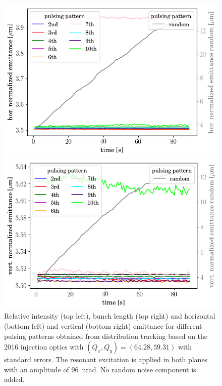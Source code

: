 \documentclass[%
 reprint,
 amsmath,amssymb,
 aps,
prstab,
]{revtex4-1}
\begin{document}
\begin{figure}[h]
\begin{minipage}[t]{0.49\linewidth}
	\end{minipage}	
	\begin{minipage}[t]{0.49\linewidth}
		\centering
		\includegraphics[width=1.0\linewidth]{2016injerra2b2u_pattern_3_5um_emit1.png}
	\end{minipage}
	\begin{minipage}[t]{0.49\linewidth}
		\centering
		\includegraphics[width=1.0\linewidth]{2016injerra2b2u_pattern_3_5um_emit2.png}
	\end{minipage}	
	\caption{\label{fig:patternsim} Relative intensity (top left), bunch length (top right) and horizontal (bottom left) and vertical (bottom right) emittance for different pulsing patterns obtained from distribution tracking based on the 2016 injection optics with $(Q_x,Q_y)=(64.28,59.31)$ with standard errors. The resonant excitation is applied in both planes with an amplitude of 96~nrad. No random noise component is added.}
\end{figure}
\end{document}
